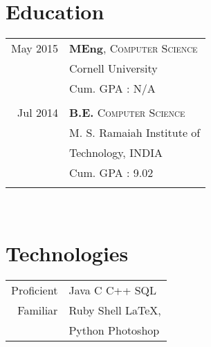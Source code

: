 \documentclass[10pt]{article} %
\begin{document}
{\begin{minipage}[t]{0.4\textwidth}

\section{\textbf{Education}}

\begin{tabular}{rl} %


May 2015 & \textbf{MEng}, \textsc{Computer Science} \\ 
& \large{Cornell University}\\
& \small Cum. GPA : N/A \\
&\\
	 

Jul 2014 & \textbf{B.E.} \textsc{Computer Science} \\ 
& \large{M. S. Ramaiah Institute of} \\
& \large{Technology,} \normalsize{INDIA} \\
& \small Cum. GPA : 9.02 \\
&\\
\end{tabular}\\[10pt]


\section{\textbf{Technologies}}
\begin{tabular}{rl}
Proficient
& Java \textbullet{} C \textbullet{} C++ \textbullet{} SQL
& \\
Familiar
& Ruby \textbullet{} Shell \textbullet{} \LaTeX,\\
& Python \textbullet{} Photoshop\\
\end{tabular}\\


\end{minipage}}
\end{document}
